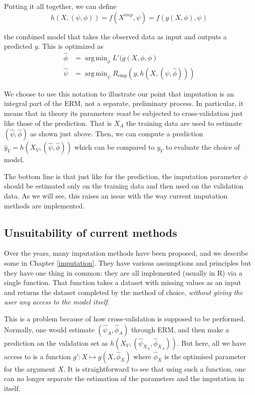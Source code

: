 \documentclass[12pt, a4paper]{memoir}
\DeclareMathOperator*{\argmin}{arg\,min}
\begin{document}
Putting it all together, we can define 
$$ h(X, (\psi, \phi)) = f(X^{imp}, \psi) = f( g(X, \phi), \psi) $$

the combined model that takes the observed data as input and outputs a predicted $y$. This is optimized as 
\begin{align*}
\hat{\phi} &= \argmin_{\phi} L'(g(X,\phi, \phi) \\
\hat{\psi} &= \argmin_{\psi} R_{\text{emp}}(y, h(X, (\psi, \hat{\phi})))
\end{align*}

We choose to use this notation to illustrate our point that imputation is an integral part of the ERM, not a separate, preliminary process. In particular, it means that in theory its parameters \emph{must} be subjected to cross-validation just like those of the prediction. That is $X_A$ the training data are used to estimate $(\hat{\psi}, \hat{\phi})$ as shown just above. Then, we can compute a prediction $\hat{y}_V = h(X_V, (\hat{\psi}, \hat{\phi}))$ which can be compared to $y_V$ to evaluate the choice of model.

The bottom line is that just like for the prediction, the imputation parameter $\phi$ should be estimated only on the training data and then used on the validation data. As we will see, this raises an issue with the way current imputation methods are implemented.

		\subsection{Unsuitability of current methods}
Over the years, many imputation methods have been proposed, and we describe some in Chapter \ref{imputation}. They have various assumptions and principles but they have one thing in common: they are all implemented (usually in R) via a single function. That function takes a dataset with missing values as an input and returns the dataset completed by the method of choice, \emph{without giving the user any access to the model itself}.

This is a problem because of how cross-validation is supposed to be performed. Normally, one would estimate $(\hat{\psi}_A, \hat{\phi}_A)$ through ERM, and then make a prediction on the validation set as $h(X_V,(\hat{\psi}_{X_A},\hat{\phi}_{X_A}))$. But here, all we have access to is a function $g': X \mapsto g(X, \hat{\phi}_X)$ where $\hat{\phi}_X$ is the optimised parameter for the argument $X$. It is straightforward to see that using such a function, one can no longer separate the estimation of the parameters and the imputation in itself.
	
\end{document}
